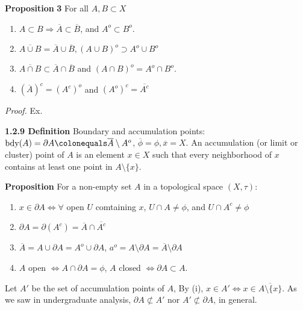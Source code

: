 \documentclass[12pt]{article}
\newcommand{\rimply}[0] { \Rightarrow }
\newcommand{\lrimply}[0] { \Leftrightarrow }
\newcommand{ \defeq }[0] { \colonequals }
\begin{document}
\begin{flushleft}
 { \bf Proposition }{ \bf 3 }For all $A, B \subset X$\begin{enumerate}
\item
                $A \subset B \rimply \overline{A} \subset \overline{B}$, and $A^o \subset B^o$.
            \item
                $\overline{A \cup B} = \overline{A} \cup \overline{B}, ( A \cup B )^o \supset A^o \cup  B^o$
            \item
                $\overline{A \cap B} \subset \overline{A} \cap \overline{B}$ and $ (A \cap B)^o = A^o \cap B^o$.
            \item
                $(\overline{A})^c = (A^c)^o$ and $(A^o)^c = \overline{A^c}$
            \end{enumerate}\begin{flushleft} 
 \emph{Proof.  }Ex.\end{flushleft}\end{flushleft}\begin{flushleft} 
 { \bf 1.2.9 Definition }Boundary and accumulation points: $\textrm{bdy}(A) = \partial A \defeq \overline{A} \setminus A^o$, $\overline{\phi} = \phi, \overline{x} = X$.
        An accumulation (or limit or cluster) point of $A$ is an element $x \in X$ such that every neighborhood of $x$ contains at least one point in $A \setminus \{ x \}$.\end{flushleft}\begin{flushleft} 
 { \bf Proposition }For a non-empty set $A$ in a topological space $(X, \tau)$:\begin{enumerate}[i]
\item
                $x \in \partial A \lrimply \forall $ open $U$ comtaining $x$, $U \cap A \not = \phi$, and $U \cap A^c \not = \phi$
            \item
                $\partial A = \partial (A ^c) = \overline{A} \cap \overline{A^c}$
            \item
                $\overline{A} = A \cup \partial A = A^o \cup \partial A$, $a^o = A \setminus \partial A = \overline{A} \setminus \partial A$
            \item
                $A$ open $\lrimply A \cap \partial A = \phi$, $A$ closed $\lrimply \partial A \subset A$.
            \end{enumerate}Let $A'$ be the set of accumulation points of $A$, By (i), $x \in A' \lrimply x \in \overline{ A \setminus \{ x \}}$. As we saw in undergraduate analysis, $\partial A \not \subset A'$ nor $A' \not \subset \partial A$, in general.\end{flushleft}\begin{flushleft} 

\end{flushleft}
\end{document}
